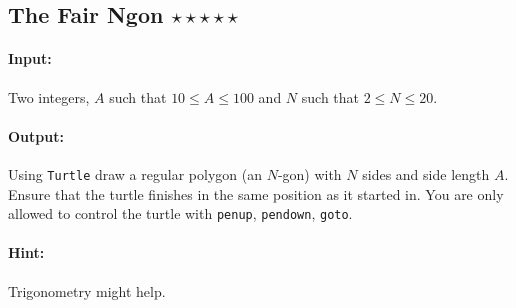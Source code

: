 \documentclass{article}
\newcommand{\s}[1]{\texttt{#1}}
\newcommand{\In}{\paragraph{Input:}}
\newcommand{\Out}{\paragraph{Output:}}
\newcommand{\Hint}{\paragraph{Hint:}}
\begin{document}
\subsection{The Fair Ngon $\star\star\star\star\star$}
\In
Two integers, $A$ such that $10 \leq A \leq 100$ and $N$
such that $2 \leq N \leq 20$.
\Out
Using \s{Turtle} draw a regular polygon (an $N$-gon) with $N$ sides and side
length $A$. Ensure that the turtle finishes in the same position as it started
in. You are only allowed to control the turtle with \s{penup}, \s{pendown},
\s{goto}.
\Hint
Trigonometry might help.
\end{document}
